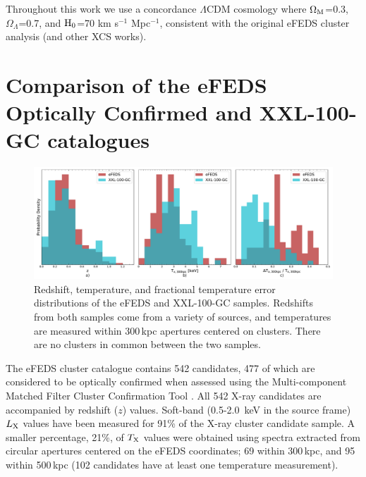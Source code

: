 \documentclass[fleqn,usenatbib]{mnras}
\begin{document}
Throughout this work we use a concordance $\Lambda$CDM cosmology where $\Omega_{\rm{M}}$=0.3, $\Omega_{\Lambda}$=0.7, and $\rm{H}_{0}$=70 km s$^{-1}$ Mpc$^{-1}$, consistent with the original eFEDS cluster analysis (and other XCS works).

\section{Comparison of the \lowercase{e}FEDS Optically Confirmed and XXL-100-GC catalogues}
\label{sec:efedsproperties}

\begin{figure}
    \centering
    \includegraphics[width=1.0\textwidth]{images/efeds_xxl_z+t+t_frac.pdf}
    \caption[]{Redshift, temperature, and fractional temperature error distributions of the eFEDS and XXL-100-GC samples. Redshifts from both samples come from a variety of sources, and temperatures are measured within 300\,kpc apertures centered on clusters. There are no clusters in common between the two samples.} 
    \label{fig:xxlefeds}
\end{figure}



The eFEDS cluster catalogue \citep{efedsclustercat} contains 542 candidates, 477 of which are considered to be optically confirmed \citep{efedsclusteropticalcat} when assessed using the Multi-component Matched Filter Cluster Confirmation Tool \citep[MCMF, ][]{MCMF}. All 542 X-ray candidates are accompanied by redshift ($z$) values. Soft-band (0.5-2.0~keV in the source frame) $L_{\rm X}$ values have been measured for 91\% of the X-ray cluster candidate sample. A smaller percentage, 21\%, of $T_{\rm X}$ values were obtained using spectra extracted from circular apertures centered on the eFEDS coordinates; 69 within 300\,kpc, and 95 within 500\,kpc (102 candidates have at least one temperature measurement).
\end{document}
